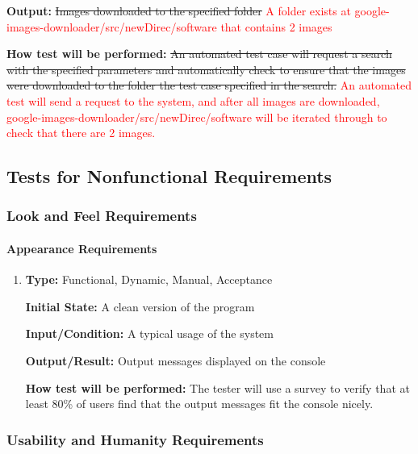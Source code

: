 \documentclass[12pt, titlepage]{article}
\begin{document}
\begin{enumerate}[label=FR-DL\arabic*:, wide=0pt, leftmargin=*]
\textbf{Output:} \sout{Images downloaded to the specified folder}
\textcolor{red}{A folder exists at google-images-downloader/src/newDirec/software that contains 2 images}
					
\textbf{How test will be performed:} \sout{An automated test case will request a search with the 
specified parameters and automatically check to ensure that the images were downloaded to 
the folder the test case specified in the search.}
\textcolor{red}{An automated test will send a request to the system, and after all images are downloaded, 
google-images-downloader/src/newDirec/software will be iterated through to check that there are 2 images.}

\end{enumerate}


\subsection{Tests for Nonfunctional Requirements}

\subsubsection{Look and Feel Requirements}
\label{LaFReqs}
		
\paragraph{Appearance Requirements}

\begin{enumerate}[label=NFR-AR\arabic*:, wide=0pt, leftmargin=*]

\item \phantom{empty}

\textbf{Type:} Functional, Dynamic, Manual, Acceptance
					
\textbf{Initial State:} A clean version of the program
					
\textbf{Input/Condition:} A typical usage of the system
					
\textbf{Output/Result:} Output messages displayed on the console
					
\textbf{How test will be performed:} The tester will use a survey to verify that at least 80\% of users find that the output messages fit the console nicely.

\end{enumerate}

\subsubsection{Usability and Humanity Requirements}
\label{UaHReqs}
		
\end{document}
